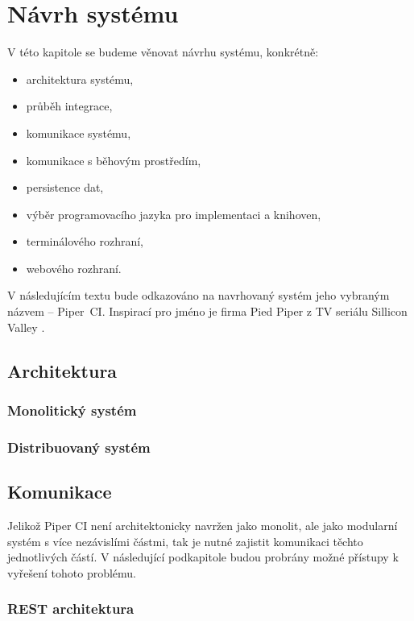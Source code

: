 \chapter{Návrh systému}

V této kapitole se budeme věnovat návrhu systému, konkrétně: 

\begin{itemize}
	\item architektura systému,
	\item průběh integrace,
	\item komunikace systému,
	\item komunikace s běhovým prostředím,
	\item persistence dat,
	\item výběr programovacího jazyka pro implementaci a knihoven,
	\item terminálového rozhraní,
	\item webového rozhraní.
\end{itemize}

V následujícím textu bude odkazováno na navrhovaný systém jeho vybraným názvem -- Piper~CI.
Inspirací pro jméno je firma Pied Piper z TV seriálu Sillicon Valley \cite{pied_piper}.

\section{Architektura}

\subsection{Monolitický systém}

\subsection{Distribuovaný systém}

\section{Komunikace}

Jelikož Piper CI není architektonicky navržen jako monolit, ale jako modularní systém s více nezávislími částmi, tak je nutné zajistit komunikaci těchto jednotlivých částí.
V následující podkapitole budou probrány možné přístupy k vyřešení tohoto problému.

\subsection{REST architektura}

